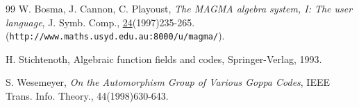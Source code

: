 \documentclass[12pt]{article}
\numberwithin{equation}{section}
\begin{document}
\begin{thebibliography}{99}
W. Bosma, J. Cannon, C. Playoust,
{\it The MAGMA algebra system, I: The user language},
J. Symb. Comp., \underline{24}(1997)235-265.
\newline
(\verb+http://www.maths.usyd.edu.au:8000/u/magma/+).

%
%
%

 H. Stichtenoth, {Algebraic function
fields and codes}, Springer-Verlag, 1993.

 S. Wesemeyer, {\it On the Automorphism Group of 
Various Goppa Codes},
IEEE Trans. Info. Theory., 44(1998)630-643.
\end{thebibliography}
\end{document}
